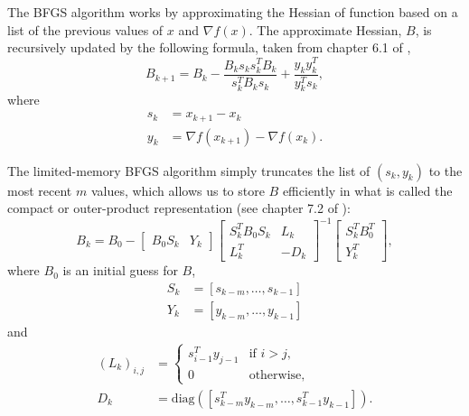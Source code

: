 \documentclass{article}
\begin{document}
The BFGS algorithm works by approximating the Hessian of function
    based on a list of the previous values of $x$ and $\nabla f(x)$.
The approximate Hessian, $B$, is recursively updated by the following formula,
    taken from chapter 6.1 of \cite{NW04},
    \begin{equation}
    B_{k+1} = B_k - \frac{B_k s_k s_k^T B_k}{s_k^T B_k s_k} +
            \frac{y_k y_k^T}{y_k^T s_k},
    \end{equation}
    where
    \begin{subequations}\begin{align}
    s_k &= x_{k+1} - x_k \\
    y_k &= \nabla f(x_{k+1}) - \nabla f(x_k).
    \end{align}\end{subequations}

The limited-memory BFGS algorithm simply truncates the list of $(s_k, y_k)$
    to the most recent $m$ values,
    which allows us to store $B$ efficiently
    in what is called the compact or outer-product representation
    (see chapter 7.2 of \cite{NW04}):
    \begin{equation}
    B_k = B_0 - 
        \begin{bmatrix} B_0 S_k & Y_k \end{bmatrix}
        \begin{bmatrix}
            S_k^T B_0 S_k & L_k \\
            L_k^T & -D_k
        \end{bmatrix}^{-1}
        \begin{bmatrix} S_k^T B_0^T \\ Y_k^T \end{bmatrix},
    \end{equation}
    where $B_0$ is an initial guess for $B$, 
    \begin{subequations}\begin{align}
        S_k &= [s_{k-m}, \ldots, s_{k-1}] \\
        Y_k &= [y_{k-m}, \ldots, y_{k-1}]
    \end{align}\end{subequations}
    and
    \begin{subequations}\begin{align}
        (L_k)_{i,j} &= 
            \begin{cases}
                s_{i-1}^T y_{j-1} & \text{if $i > j$,} \\
                0 & \text{otherwise,} 
            \end{cases} \\
        D_k &= \text{diag}([s_{k-m}^T y_{k-m}, \ldots, s_{k-1}^T y_{k-1}]).
    \end{align} \end{subequations}
\end{document}
